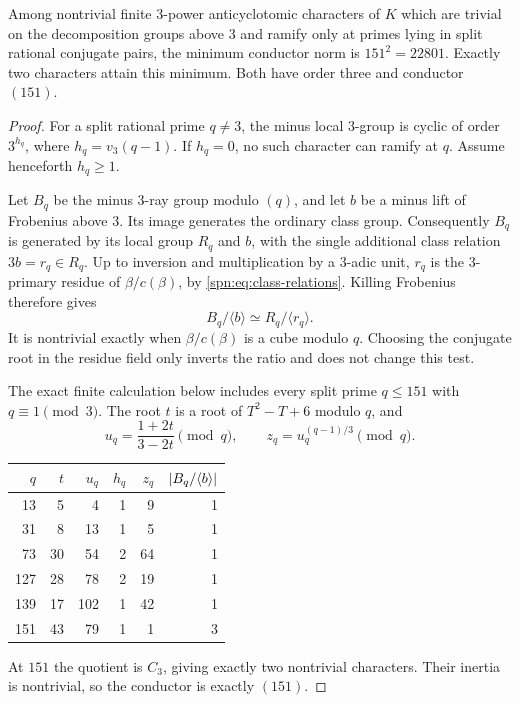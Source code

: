 \begin{theorem}\label{spn:thm:minimum}
Among nontrivial finite $3$-power anticyclotomic characters of $K$ which are
trivial on the decomposition groups above $3$ and ramify only at primes lying
in split rational conjugate pairs, the minimum conductor norm is
$151^2=22801$. Exactly two characters attain this minimum. Both have order
three and conductor $(151)$.
\end{theorem}

\begin{proof}
For a split rational prime $q\ne3$, the minus local $3$-group is cyclic of
order $3^{h_q}$, where $h_q=v_3(q-1)$. If $h_q=0$, no such character can
ramify at $q$. Assume henceforth $h_q\ge1$.

Let $B_q$ be the minus $3$-ray group modulo $(q)$, and let $b$ be a minus
lift of Frobenius above $3$. Its image generates the ordinary class group.
Consequently $B_q$ is generated by its local group $R_q$ and $b$, with the
single additional class relation $3b=r_q\in R_q$. Up to inversion and
multiplication by a $3$-adic unit, $r_q$ is the $3$-primary residue of
$\beta/c(\beta)$, by \eqref{spn:eq:class-relations}. Killing Frobenius
therefore gives
\begin{equation}\label{spn:eq:ray-quotient}
 B_q/\langle b\rangle\simeq R_q/\langle r_q\rangle .
\end{equation}
It is nontrivial exactly when $\beta/c(\beta)$ is a cube modulo $q$. Choosing the conjugate root in the residue field only inverts the ratio
and does not change this test.

The exact finite calculation below includes every split prime $q\le151$ with
$q\equiv1\pmod3$. The root $t$ is a root of $T^2-T+6$ modulo $q$, and
\[
 u_q=\frac{1+2t}{3-2t}\pmod q,\qquad z_q=u_q^{(q-1)/3}\pmod q .
\]
\begin{center}
\begin{tabular}{rrrrrr}
\toprule
$q$ & $t$ & $u_q$ & $h_q$ & $z_q$ & $\lvert B_q/\langle b\rangle\rvert$\\
\midrule
13  &5 &4  &1&9 &1\\
31  &8 &13 &1&5 &1\\
73  &30&54 &2&64&1\\
127 &28&78 &2&19&1\\
139 &17&102&1&42&1\\
151 &43&79 &1&1 &3\\
\bottomrule
\end{tabular}
\end{center}
At $151$ the quotient is $C_3$, giving exactly two nontrivial characters.
Their inertia is nontrivial, so the conductor is exactly $(151)$.


\end{proof}
